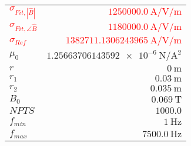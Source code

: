 
{%
    \begin{center}
    \label{tab:fitparams:cu:freq:exact}
    \begin{tabular}{lr}
    \toprule
        \textcolor{red}{$\sigma_{Fit,|\hat{B}|}$} & \textcolor{red}{$\SI{1250000.0}{\ampere\per\volt\per\meter}$}\\
        \textcolor{red}{$\sigma_{Fit,\angle\hat{B}}$} & \textcolor{red}{$\SI{1180000.0}{\ampere\per\volt\per\meter}$}\\
        \textcolor{red}{$\sigma_{Ref}$} & \textcolor{red}{$\SI{1382711.1306243965}{\ampere\per\volt\per\meter}$}\\
        $\mu_0$ & $\SI{1.25663706143592e-6}{\newton\per\ampere\squared}$\\
        $r$ & $\SI{0}{\meter}$\\
        $r_1$ & $\SI{0.03}{\meter}$\\
        $r_2$ & $\SI{0.035}{\meter}$\\
        $B_0$ & $\SI{0.069}{\tesla}$\\
        $NPTS$ & $\num{1000.0}$\\
        $f_{min}$ & $\SI{1}{\hertz}$\\
        $f_{max}$ & $\SI{7500.0}{\hertz}$\\

    \bottomrule
    \end{tabular}
    \end{center}
}


